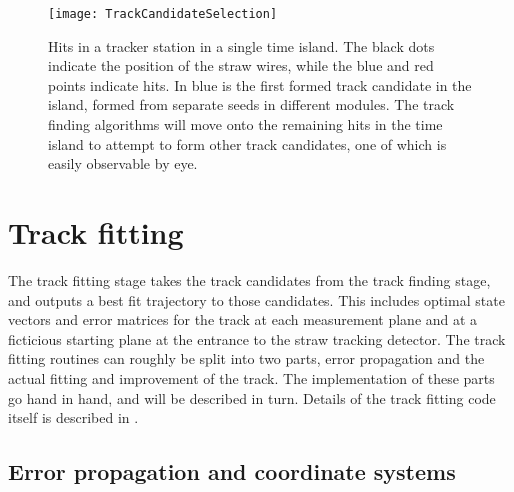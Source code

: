 \begin{figure}[]
    \centering
    \texttt{[image: TrackCandidateSelection]}
    \caption[Track candidate selection]{Hits in a tracker station in a single time island. The black dots indicate the position of the straw wires, while the blue and red points indicate hits. In blue is the first formed track candidate in the island, formed from separate seeds in different modules. The track finding algorithms will move onto the remaining hits in the time island to attempt to form other track candidates, one of which is easily observable by eye.}    
    \label{fig:TrackCandidateSelection}
\end{figure}






\section{Track fitting}
\label{sec:TrackFitting}


The track fitting stage takes the track candidates from the track finding stage, and outputs a best fit trajectory to those candidates. This includes optimal state vectors and error matrices for the track at each measurement plane and at a ficticious starting plane at the entrance to the straw tracking detector. The track fitting routines can roughly be split into two parts, error propagation and the actual fitting and improvement of the track. The implementation of these parts go hand in hand, and will be described in turn. Details of the track fitting code itself is described in . 


\subsection{Error propagation and coordinate systems}
\label{sub:Geane}

